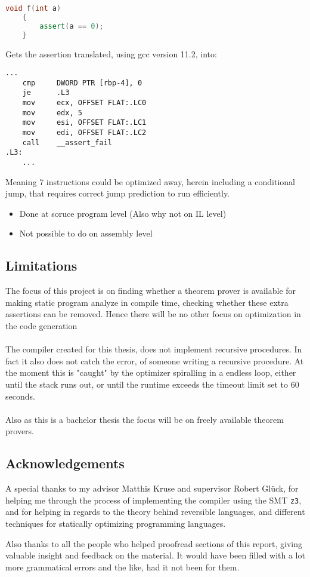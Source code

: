 \begin{lstlisting}[language=c++]
    void f(int a)
    {
        assert(a == 0);
    }
\end{lstlisting}
\noindent
Gets the assertion translated, using gcc version 11.2, into:

\begin{lstlisting}[language={[x86masm]Assembler}]
    ...
    cmp     DWORD PTR [rbp-4], 0
    je      .L3
    mov     ecx, OFFSET FLAT:.LC0
    mov     edx, 5
    mov     esi, OFFSET FLAT:.LC1
    mov     edi, OFFSET FLAT:.LC2
    call    __assert_fail
.L3:
    ...
\end{lstlisting}
\noindent
Meaning 7 instructions could be optimized away, herein including a conditional jump,
that requires correct jump prediction to run efficiently.

\begin{itemize}
    \item Done at soruce program level (Also why not on IL level)
    \item Not possible to do on assembly level
\end{itemize}

\subsection{Limitations }
The focus of this project is on finding whether a theorem prover is available for making static
program analyze in compile time, checking whether these extra assertions can be removed. Hence
there will be no other focus on optimization in the code generation
\\
\\
The compiler created for this thesis, does not implement recursive procedures. In fact it also
does not catch the error, of someone writing a recursive procedure. At the moment this is "caught"
by the optimizer spiralling in a endless loop, either until the stack runs out, or until the
runtime exceeds the timeout limit set to $60$ seconds.
\\
\\
Also as this is a bachelor thesis the focus will be on freely available theorem provers.

\subsection{Acknowledgements }
A special thanks to my advisor Matthis Kruse and supervisor Robert Glück, for helping me through
the process of implementing the compiler using the SMT \texttt{z3}, and for helping in regards to
the theory behind reversible languages, and different techniques for statically optimizing
programming languages.

Also thanks to all the people who helped proofread sections of this report, giving valuable
insight and feedback on the material. It would have been filled with a lot more grammatical errors
and the like, had it not been for them.